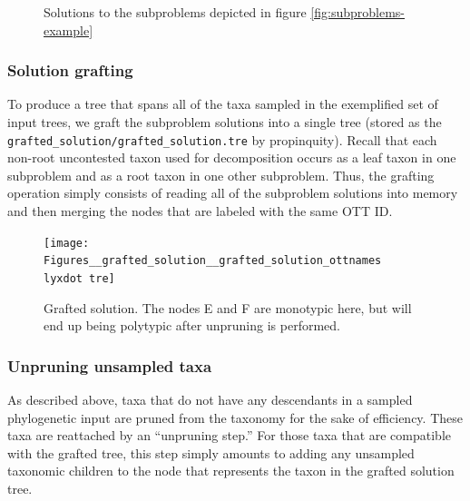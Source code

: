 \documentclass[fleqn,12pt,lineno,english]{wlpeerj}
\newcommand{\lyxdot}{.}
\begin{document}
\begin{figure}
\hfill{}\hfill{}\hfill{}

\caption{Solutions to the subproblems depicted in figure \ref{fig:subproblems-example}}
\label{fig:subproblem-solutions.}
\end{figure}


\subsubsection{Solution grafting}

To produce a tree that spans all of the taxa sampled in the exemplified
set of input trees, we graft the subproblem solutions into a single
tree (stored as the \texttt{grafted\_solution/grafted\_solution.tre}
by propinquity). Recall that each non-root uncontested taxon used
for decomposition occurs as a leaf taxon in one subproblem and as
a root taxon in one other subproblem. Thus, the grafting operation
simply consists of reading all of the subproblem solutions into memory
and then merging the nodes that are labeled with the same OTT ID.

\begin{figure}
\begin{centering}
\texttt{[image: Figures\_\_grafted\_solution\_\_grafted\_solution\_ottnames\\lyxdot tre]}
\par\end{centering}
\caption{Grafted solution. The nodes E and F are monotypic here, but will end
up being polytypic after unpruning is performed.}
\end{figure}


\subsubsection{Unpruning unsampled taxa}

As described above, taxa that do not have any descendants in a sampled
phylogenetic input are pruned from the taxonomy for the sake of efficiency.
These taxa are reattached by an ``unpruning step.'' For those taxa
that are compatible with the grafted tree, this step simply amounts
to adding any unsampled taxonomic children to the node that represents
the taxon in the grafted solution tree.
\end{document}
